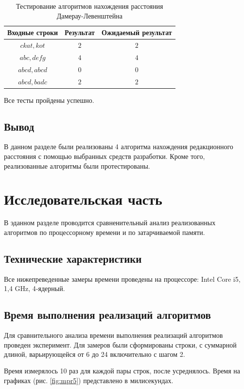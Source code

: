 \documentclass{report}
\begin{document}
\begin{table}[h!p]
	\begin{center}
		\caption{\label{tbl:test}Тестирование алгоритмов нахождения расстояния Дамерау-Левенштейна}
		\begin{tabular}{|c|c|c|}
			\hline
			Входные строки & Результат & Ожидаемый результат \\ 
			\hline
			$ckat, kot$ & $2$  & $2$\\\hline
			$abc, defg$  & $4$  & $4$\\\hline
			$abcd, abcd$  & $0$  & $0$\\\hline
			$abcd, badc$  & $2$  & $2$\\\hline
		\end{tabular}
	\end{center}
\end{table}

Все тесты пройдены успешно.

\section{Вывод}

В данном разделе были реализованы 4 алгоритма нахождения редакционного расстояния с помощью выбранных средств разработки. Кроме того, реализованные алгоритмы были протестированы.

\chapter{Исследовательская часть}
В эданном разделе проводится сравненительный анализ реализованных алгоритмов по процессорному времени и по затарчиваемой памяти.
\section{Технические характеристики}

Все нижепреведенные замеры времени проведены на процессоре: Intel Core i5, 1,4 GHz, 4‑ядерный.

\section{Время выполнения реализаций алгоритмов}

Для сравнительного анализа времени выполнения реализаций алгоритмов проведен эксперимент. Для замеров были сформированы строки, с суммарной длиной, варьирующейся от 6 до 24 включительно с шагом 2.

Время измерялось 10 раз для каждой пары строк, после усреднялось. Время на графиках (рис. \ref{fig:mpr5}) представлено в милисекундах. 
\end{document}
